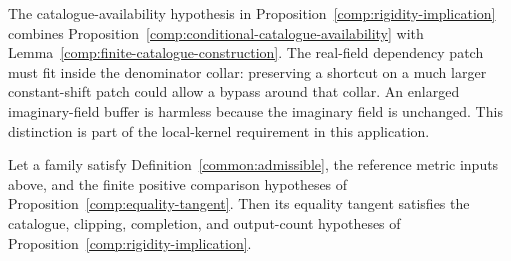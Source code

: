 The catalogue-availability hypothesis in
Proposition~\ref{comp:rigidity-implication} combines
Proposition~\ref{comp:conditional-catalogue-availability} with
Lemma~\ref{comp:finite-catalogue-construction}.  The real-field dependency
patch must fit inside the denominator collar: preserving a shortcut
on a much larger constant-shift patch could allow a bypass around
that collar.  An enlarged imaginary-field buffer is harmless because
the imaginary field is unchanged.  This distinction is part of the
local-kernel requirement in this application.

\begin{lemma}
\label{common:forcing-verification}
Let a family satisfy Definition~\ref{common:admissible}, the reference
metric inputs above, and the finite positive comparison hypotheses of
Proposition~\ref{comp:equality-tangent}.  Then its equality tangent
satisfies the catalogue, clipping, completion, and output-count
hypotheses of Proposition~\ref{comp:rigidity-implication}.
\end{lemma}
